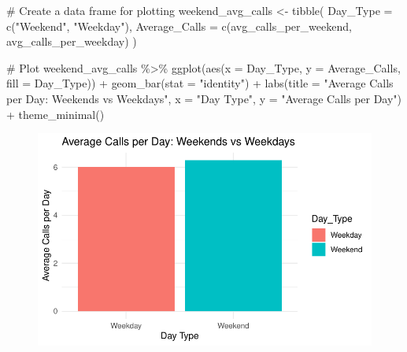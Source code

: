 \documentclass[
  letterpaper,
  DIV=11,
  numbers=noendperiod]{scrartcl}
\newenvironment{Shaded}{\begin{snugshade}}{\end{snugshade}}
\newcommand{\AttributeTok}[1]{\textcolor[rgb]{0.40,0.45,0.13}{#1}}
\newcommand{\CommentTok}[1]{\textcolor[rgb]{0.37,0.37,0.37}{#1}}
\newcommand{\FunctionTok}[1]{\textcolor[rgb]{0.28,0.35,0.67}{#1}}
\newcommand{\NormalTok}[1]{\textcolor[rgb]{0.00,0.23,0.31}{#1}}
\newcommand{\OtherTok}[1]{\textcolor[rgb]{0.00,0.23,0.31}{#1}}
\newcommand{\SpecialCharTok}[1]{\textcolor[rgb]{0.37,0.37,0.37}{#1}}
\newcommand{\StringTok}[1]{\textcolor[rgb]{0.13,0.47,0.30}{#1}}
\begin{document}
\begin{Shaded}
\begin{Highlighting}[]
\CommentTok{\# Create a data frame for plotting}
\NormalTok{weekend\_avg\_calls }\OtherTok{\textless{}{-}} \FunctionTok{tibble}\NormalTok{(}
  \AttributeTok{Day\_Type =} \FunctionTok{c}\NormalTok{(}\StringTok{"Weekend"}\NormalTok{, }\StringTok{"Weekday"}\NormalTok{),}
  \AttributeTok{Average\_Calls =} \FunctionTok{c}\NormalTok{(avg\_calls\_per\_weekend, avg\_calls\_per\_weekday)}
\NormalTok{)}

\CommentTok{\# Plot}
\NormalTok{weekend\_avg\_calls }\SpecialCharTok{\%\textgreater{}\%}
  \FunctionTok{ggplot}\NormalTok{(}\FunctionTok{aes}\NormalTok{(}\AttributeTok{x =}\NormalTok{ Day\_Type, }\AttributeTok{y =}\NormalTok{ Average\_Calls, }\AttributeTok{fill =}\NormalTok{ Day\_Type)) }\SpecialCharTok{+}
  \FunctionTok{geom\_bar}\NormalTok{(}\AttributeTok{stat =} \StringTok{"identity"}\NormalTok{) }\SpecialCharTok{+}
  \FunctionTok{labs}\NormalTok{(}\AttributeTok{title =} \StringTok{"Average Calls per Day: Weekends vs Weekdays"}\NormalTok{, }\AttributeTok{x =} \StringTok{"Day Type"}\NormalTok{, }\AttributeTok{y =} \StringTok{"Average Calls per Day"}\NormalTok{) }\SpecialCharTok{+}
  \FunctionTok{theme\_minimal}\NormalTok{()}
\end{Highlighting}
\end{Shaded}

\begin{figure}[H]

{\centering \includegraphics{Report_files/figure-pdf/unnamed-chunk-7-2.pdf}

}

\end{figure}
\end{document}
